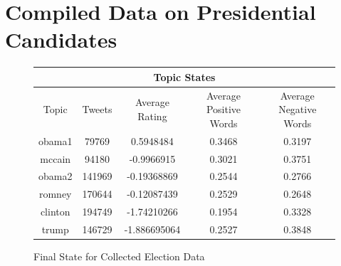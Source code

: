 \documentclass[12pt,a4paper]{report}
\begin{document}
  \section{Compiled Data on Presidential Candidates}
  \begin{figure}[h]
    \centering
    \begin{tabular}{|c||c|c|c|c|}
      \hline
      \multicolumn{5}{|c|}{Topic States} \\
      \hline
      Topic & Tweets & Average Rating & Average Positive Words & Average Negative Words \\ [0.5ex]
      \hline
      \hline
      obama1 & 79769 & 0.5948484 & 0.3468 & 0.3197 \\
      \hline
      mccain & 94180 & -0.9966915 & 0.3021 & 0.3751 \\
      \hline
      obama2 & 141969 & -0.19368869 & 0.2544 & 0.2766 \\
      \hline
      romney & 170644 & -0.12087439 & 0.2529 & 0.2648 \\
      \hline
      clinton & 194749 & -1.74210266 & 0.1954 & 0.3328 \\
      \hline
      trump & 146729 & -1.886695064 & 0.2527 & 0.3848 \\
      \hline
    \end{tabular}
    \caption{Final State for Collected Election Data}
    \label{t:1}
  \end{figure}
\end{document}
